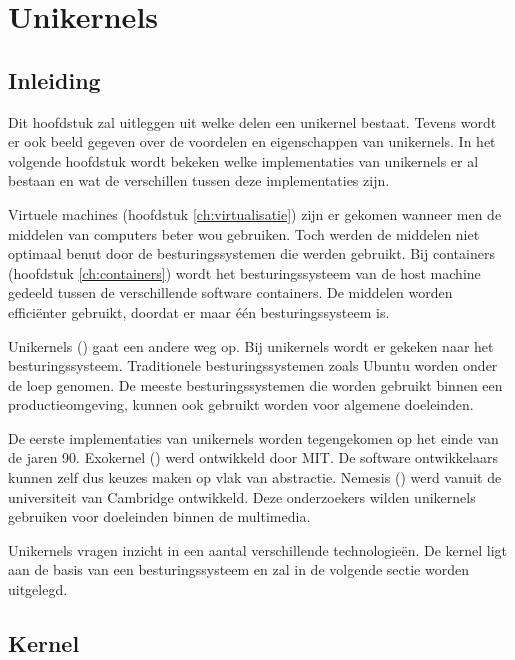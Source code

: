 \chapter{Unikernels}
\label{ch:unikernels}

\section{Inleiding}

Dit hoofdstuk zal uitleggen uit welke delen een unikernel bestaat. Tevens wordt er ook beeld gegeven over de voordelen en eigenschappen van unikernels. In het volgende hoofdstuk wordt bekeken welke implementaties van unikernels er al bestaan en wat de verschillen tussen deze implementaties zijn.

Virtuele machines (hoofdstuk \ref{ch:virtualisatie}) zijn er gekomen wanneer men de middelen van computers beter wou gebruiken. Toch werden de middelen niet optimaal benut door de besturingssystemen die werden gebruikt. Bij containers (hoofdstuk \ref{ch:containers}) wordt het besturingssysteem van de host machine gedeeld tussen de verschillende software containers. De middelen worden efficiënter gebruikt, doordat er maar één besturingssysteem is.

Unikernels (\cite{madhavapeddy_unikernels_2013}) gaat een andere weg op. Bij unikernels wordt er gekeken naar het besturingssysteem. Traditionele besturingssystemen zoals Ubuntu worden onder de loep genomen. De meeste besturingssystemen die worden gebruikt binnen een productieomgeving, kunnen ook gebruikt worden voor algemene doeleinden.

De eerste implementaties van unikernels worden tegengekomen op het einde van de jaren 90. Exokernel (\cite{mit_mit_1998}) werd ontwikkeld door MIT. De software ontwikkelaars kunnen zelf dus keuzes maken op vlak van abstractie. Nemesis (\cite{university_of_cambridge_nemesis_2000}) werd vanuit de universiteit van Cambridge ontwikkeld. Deze onderzoekers wilden unikernels gebruiken voor doeleinden binnen de multimedia.

Unikernels vragen inzicht in een aantal verschillende technologieën. De kernel ligt aan de basis van een besturingssysteem en zal in de volgende sectie worden uitgelegd.

\section{Kernel}

